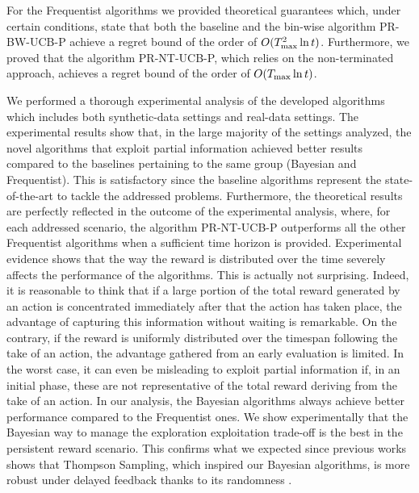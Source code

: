 For the Frequentist algorithms we provided theoretical guarantees which, under certain conditions, state that both the baseline and the bin-wise algorithm PR-BW-UCB-P achieve a regret bound of the order of $O(T_{\textnormal{max}}^2\ln t)$. Furthermore, we proved that the algorithm PR-NT-UCB-P, which relies on the non-terminated approach, achieves a regret bound of the order of $O(T_{\textnormal{max}}\ln t)$.

We performed a thorough experimental analysis of the developed algorithms which includes both synthetic-data settings and real-data settings. The experimental results show that, in the large majority of the settings analyzed, the novel algorithms that exploit partial information achieved better results compared to the baselines pertaining to the same group (Bayesian and Frequentist). This is satisfactory since the baseline algorithms represent the state-of-the-art to tackle the addressed problems. Furthermore, the theoretical results are perfectly reflected in the outcome of the experimental analysis, where, for each addressed scenario, the algorithm PR-NT-UCB-P outperforms all the other Frequentist algorithms when a sufficient time horizon is provided. Experimental evidence shows that the way the reward is distributed over the time severely affects the performance of the algorithms. This is actually not surprising. Indeed, it is reasonable to think that if a large portion of the total reward generated by an action is concentrated immediately after that the action has taken place, the advantage of capturing this information without waiting is remarkable. On the contrary, if the reward is uniformly distributed over the timespan following the take of an action, the advantage gathered from an early evaluation is limited. In the worst case, it can even be misleading to exploit partial information if, in an initial phase, these are not representative of the total reward deriving from the take of an action. In our analysis, the Bayesian algorithms always achieve better performance compared to the Frequentist ones. We show experimentally that the Bayesian way to manage the exploration exploitation trade-off is the best in the persistent reward scenario. This confirms what we expected since previous works shows that Thompson Sampling, which inspired our Bayesian algorithms, is more robust under delayed feedback thanks to its randomness \citep{Chapelle2011Thompson}.


